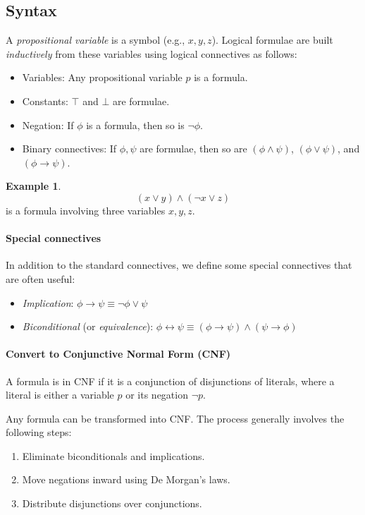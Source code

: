 \documentclass[oneside,11pt,dvipsnames]{book}
\numberwithin{equation}{section}
\theoremstyle{definition}
\newtheorem{example}{Example}[section]
\theoremstyle{remark}
\begin{document}
\subsection{Syntax}

A \emph{propositional variable} is a symbol (e.g., $x, y, z$). Logical formulae are built \emph{inductively} from these variables using logical connectives as follows:

\begin{itemize}
  \item Variables: Any propositional variable $p$ is a formula.
  \item Constants: $\top$ and $\bot$ are formulae.
  \item Negation: If $\phi$ is a formula, then so is $\lnot \phi$.
  \item Binary connectives: If $\phi, \psi$ are formulae, then so are
    $(\phi \land \psi)$, $(\phi \lor \psi)$, and $(\phi \to \psi)$.
\end{itemize}

\begin{example}

\[
(x \lor y) \land (\lnot x \lor z)
\]
is a formula involving three variables $x,y,z$.
\end{example}

\paragraph{Special connectives} In addition to the standard connectives, we define some special connectives that are often useful:

\begin{itemize}
    \item \emph{Implication}: $\phi \to \psi \equiv \lnot \phi \lor \psi$
    \item \emph{Biconditional} (or \emph{equivalence}): $\phi \leftrightarrow \psi \equiv (\phi \to \psi) \land (\psi \to \phi)$
\end{itemize}


\paragraph{Convert to Conjunctive Normal Form (CNF)} A formula is in CNF if it is a conjunction of disjunctions of literals,
where a literal is either a variable $p$ or its negation $\lnot p$. 

Any formula can be transformed into CNF. The process generally involves the following steps:
\begin{enumerate}
\item Eliminate biconditionals and implications.
\item Move negations inward using De Morgan's laws.
\item Distribute disjunctions over conjunctions.
\end{enumerate}
\end{document}
